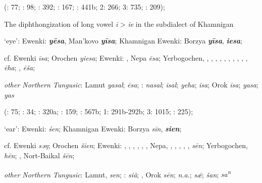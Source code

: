 \documentclass[output=paper,colorlinks,citecolor=brown]{langscibook}
\begin{document}
    (\citealt{Castrén1856}: 77; \citealt{Janhunen1991}: 98; \citealt{Chaoke2014bB}: 392; \citealt{Chaoke2014a}: 167; \citealt{Vasilevic1958}: 441b; \citealt{Cincius1975B} 2: 266; \citealt{Hauer1952} 3: 735; \citealt{Zikmundová2013a}: 209);

\z
\z
\pagebreak

\ea
The diphthongization of long vowel \textit{ī} > \textit{ie} in the  subdialect of Khamnigan

\ea ‘eye’:  Ewenki:  \textbf{\textit{yēsa}}, Man’kovo \textbf{\textit{yīsa}}; Khamnigan Ewenki: Borzya \textbf{\textit{yīsa}},  \textbf{\textit{iesa}};

    cf.  Ewenki \textit{īsa}; Orochen \textit{yiesa};  Ewenki: , Nepa \textit{ēsa}; Yerbogochen, , , , , , , , , , ,  \textit{ēha}; ,  \textit{ēša};

    \textit{other Northern Tungusic}: Lamut \textit{yasal};  \textit{ēsa}; \textit{}:  \textit{nasal};  \textit{isal};  \textit{yeha};  \textit{isa}; Orok \textit{īsa};  \textit{yasa};  \textit{yas} 
    
    (\citealt{Castrén1856}: 75; \citealt{Janhunen1991}: 34; \citealt{Dorji1998}: 320a; \citealt{Chaoke2014a}: 159; \citealt{Vasilevic1958}: 567b; \citealt{Cincius1975B} 1: 291b-292b; \citealt{Hauer1952} 3: 1015; \citealt{Zikmundová2013a}: 225);

    \ex ‘ear’:  Ewenki:  \textit{śen}; Khamnigan Ewenki: Borzya \textit{sīn},  \textbf{\textit{sien}};

    cf.  Ewenki \textit{sǝŋ}; Orochen \textit{šien};  Ewenki: , , , , , , Nepa, , , , , ,  \textit{sēn}; Yerbogochen,  \textit{hēn}; , Nort-Baikal \textit{šēn};

    \textit{other Northern Tungusic}: Lamut,  \textit{sen}; \textit{}:  \textit{siã}; , Orok \textit{sēn};  \textit{n.a}.;  \textit{s\={æ}};  \textit{šan};  \textit{sa\textsuperscript{n}} 
    
\end{document}
